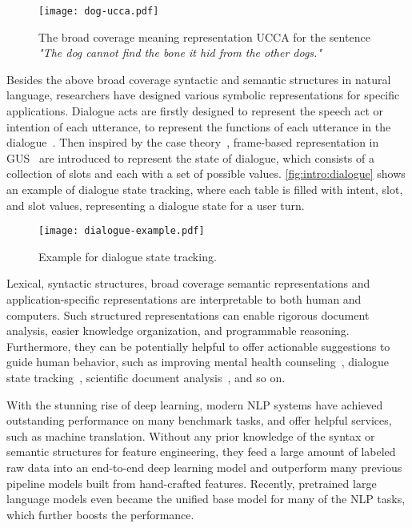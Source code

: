 \begin{figure}[!th]
\centering
\texttt{[image: dog-ucca.pdf]}
\caption{\label{fig:intro:dog-ucca} The broad coverage meaning
  representation UCCA for the sentence \textit{"The dog cannot
    find the bone it hid from the other dogs."}}
\end{figure}

Besides the above broad coverage syntactic and semantic structures in
natural language, researchers have designed various symbolic
representations for specific applications. Dialogue acts are firstly
designed to represent the speech act or intention of each utterance,
to represent the functions of each utterance in the
dialogue~\citep{wittgenstein2010philosophical,bunt2010towards}. Then
inspired by the case theory~\citep{Fillmore:68}, frame-based
representation in GUS~\citep{bobrow1977gus} are introduced to
represent the state of dialogue, which consists of a collection of
slots and each with a set of possible
values. \autoref{fig:intro:dialogue} shows an example of dialogue state
tracking, where each table is filled with intent, slot, and slot values,
representing a dialogue state for a user turn.

\begin{figure}[!th]
\centering
\texttt{[image: dialogue-example.pdf]}
\caption{\label{fig:intro:dialogue} Example for dialogue state
  tracking.}
\end{figure}

Lexical, syntactic structures, broad coverage semantic representations
and application-specific representations are interpretable to both
human and computers. Such structured representations can enable
rigorous document analysis, easier knowledge organization, and
programmable reasoning. Furthermore, they can be potentially helpful
to offer actionable suggestions to guide human behavior, such as
improving mental health counseling~\citep{tanana2016comparison},
dialogue state tracking~\citep{budzianowski2018multiwoz}, scientific
document analysis~\citep{dernoncourt2017pubmed}, and so on.

With the stunning rise of deep learning, modern NLP systems have
achieved outstanding performance on many benchmark tasks, and offer
helpful services, such as machine translation. Without any prior
knowledge of the syntax or semantic structures for feature
engineering, they feed a large amount of labeled raw data
into an end-to-end deep learning model and outperform many previous
pipeline models built from hand-crafted features. Recently, pretrained
large language models even became the unified base model for many of
the NLP tasks, which further boosts the performance.

